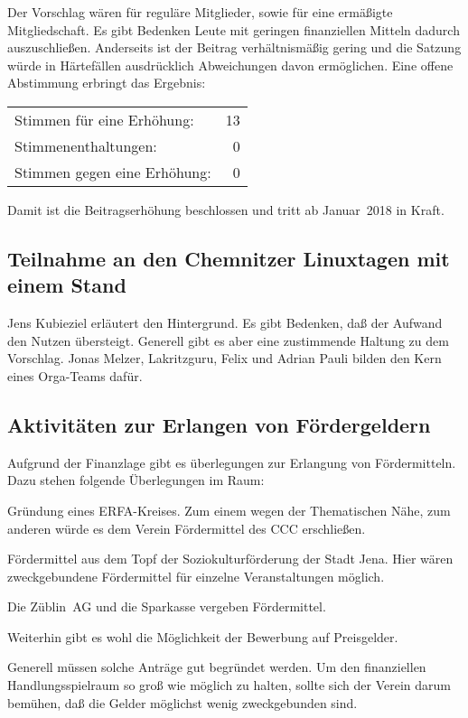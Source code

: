 \documentclass[]{scrartcl}
\newenvironment{packed_item}{
\begin{itemize}
\setlength{\itemsep}{-5pt}
\setlength{\parsep}{0pt}
}{\end{itemize}}
\newenvironment{eingerueckt}{
\begin{addmargin*}[3ex]{-3ex}
\begin{minipage}{\linewidth}
}{
\end{minipage}
\end{addmargin*}}
\newcommand{\qbi}{Jens Kubieziel}
\newcommand{\adrian}{Adrian Pauli}
\newcommand{\joe}{Jonas Melzer}
\begin{document}
\begin{multicols}{2}
Der Vorschlag wären  für reguläre Mitglieder, sowie  für
eine ermäßigte Mitgliedschaft. Es gibt Bedenken Leute mit geringen
finanziellen Mitteln dadurch auszuschließen. Anderseits ist der Beitrag
verhältnismäßig gering und die Satzung würde in Härtefällen ausdrücklich
Abweichungen davon ermöglichen. Eine offene Abstimmung erbringt das
Ergebnis:

\begin{eingerueckt}
\begin{tabular}{lr}
Stimmen für eine Erhöhung: & 13 \\
Stimmenenthaltungen: & 0 \\
Stimmen gegen eine Erhöhung: & 0
\end{tabular}
\end{eingerueckt}

Damit ist die Beitragserhöhung beschlossen und tritt ab Januar~2018 in
Kraft.
    
\subsection{Teilnahme an den Chemnitzer Linuxtagen mit einem Stand}
\qbi{} erläutert den Hintergrund. Es gibt Bedenken, daß der Aufwand den Nutzen
übersteigt. Generell gibt es aber eine zustimmende Haltung zu dem Vorschlag.
\joe{}, Lakritzguru, Felix und \adrian{} bilden den Kern eines Orga-Teams dafür.

\subsection{Aktivitäten zur Erlangen von Fördergeldern}
Aufgrund der Finanzlage gibt es überlegungen zur Erlangung von
Fördermitteln. Dazu stehen folgende Überlegungen im Raum:
\begin{packed_item}
\item Gründung eines ERFA-Kreises. Zum einem wegen der Thematischen Nähe,
zum anderen würde es dem Verein Fördermittel des CCC erschließen. 
\item Fördermittel aus dem Topf der Soziokulturförderung der Stadt Jena.
Hier wären zweckgebundene Fördermittel für einzelne Veranstaltungen möglich.
\item Die Züblin~AG und die Sparkasse vergeben Fördermittel.
\item Weiterhin gibt es wohl die Möglichkeit der Bewerbung auf Preisgelder.
\end{packed_item}
Generell müssen solche Anträge gut begründet werden. Um den finanziellen
Handlungsspielraum so groß wie möglich zu halten, sollte sich der Verein
darum bemühen, daß die Gelder möglichst wenig zweckgebunden sind.


\end{multicols}
\end{document}
